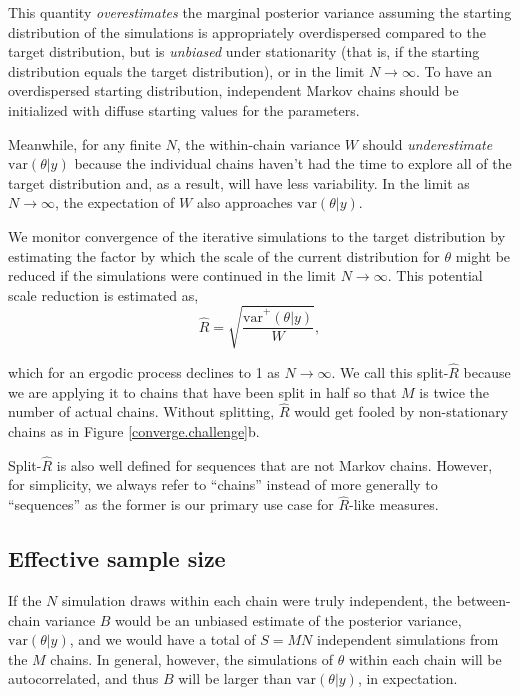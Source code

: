 \documentclass[american,]{article}
\begin{document}
This quantity \emph{overestimates} the marginal posterior variance
assuming the starting distribution of the simulations is appropriately
overdispersed compared to the target distribution, but is
\emph{unbiased} under stationarity (that is, if the starting
distribution equals the target distribution), or in the limit
\(N\rightarrow\infty\). To have an overdispersed starting distribution,
independent Markov chains should be initialized with diffuse starting
values for the parameters.

Meanwhile, for any finite \(N\), the within-chain variance \(W\) should
\emph{underestimate} \(\mbox{var}(\theta |y)\) because the
individual chains haven't had the time to explore all of the target
distribution and, as a result, will have less variability. In the limit
as \(N\rightarrow\infty\), the expectation of \(W\) also approaches
\(\mbox{var}(\theta |y)\).

We monitor convergence of the iterative simulations to the target
distribution by estimating the factor by which the scale of the current
distribution for \(\theta\) might be reduced if the simulations were
continued in the limit \(N\rightarrow\infty\). This potential scale
reduction is estimated as,
\begin{equation}
\widehat{R} = \sqrt{\frac{\widehat{\mbox{var}}^+(\theta | y)}{W}},
\end{equation}

which for an ergodic process declines to 1 as \(N\rightarrow\infty\). We call this
split-\(\widehat{R}\) because we are applying it to chains that
have been split in half so that \(M\) is twice the number of actual
chains. Without splitting, \(\widehat{R}\) would get fooled by
non-stationary chains as in Figure \ref{converge.challenge}b.

Split-\(\widehat{R}\) is also well defined for
sequences that are not Markov chains. However, for simplicity, we always
refer to ``chains'' instead of more generally to ``sequences'' as the former
is our primary use case for \(\widehat{R}\)-like measures.

\hypertarget{ESS}{%
\subsection{Effective sample size}\label{ESS}}

If the \(N\) simulation draws within each chain were truly independent,
the between-chain variance \(B\) would be an unbiased estimate of the
posterior variance, \(\mbox{var}(\theta | y)\), and we would have a
total of \(S = MN\) independent simulations from the \(M\) chains. In
general, however, the simulations of \(\theta\) within each chain will
be autocorrelated, and thus \(B\) will be larger than
\(\mbox{var}(\theta | y)\), in expectation.
\end{document}
